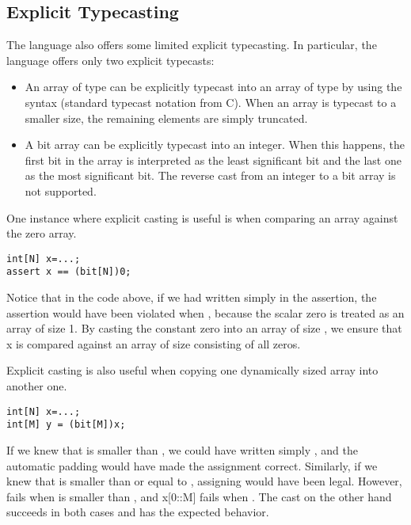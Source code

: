 \subsection{Explicit Typecasting}
The \Sk{} language also offers some limited explicit typecasting. In particular, the language offers only two explicit typecasts:
\begin{itemize}

\item An array  of type  can be explicitly typecast into an array of type  by using the syntax  (standard typecast notation from C). When an array is typecast to a smaller size, the remaining elements are simply truncated. 

\item A bit array  can be explicitly typecast into an integer. When this happens, the first bit in the array is interpreted as the least significant bit and the last one as the most significant bit. The reverse cast from an integer to a bit array is not supported.

\end{itemize}

\begin{Example}
One instance where explicit casting is useful is when comparing an array against the zero array.
\begin{lstlisting}
int[N] x=...;
assert x == (bit[N])0;
\end{lstlisting}
Notice that in the code above, if we had written simply  in the assertion, the assertion would have been violated when , because the scalar zero is treated as an array of size 1. By casting the constant zero into an array of size , we ensure that x is compared against an array of size  consisting of all zeros.
\end{Example}

\begin{Example}
Explicit casting is also useful when copying one dynamically sized array into another one.
\begin{lstlisting}
int[N] x=...;
int[M] y = (bit[M])x;
\end{lstlisting}
If we knew that  is smaller than , we could have written simply , and the automatic padding would have made the assignment correct. Similarly, if we knew that  is smaller than or equal to , assigning  would have been legal. However,  fails when  is smaller than , and x[0::M] fails when . The cast on the other hand succeeds in both cases and has the expected behavior.
\end{Example}

